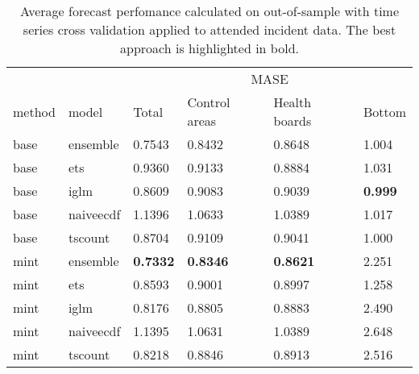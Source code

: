 \documentclass[
  authoryear,
  preprint,
  3p]{elsarticle}
\begin{document}
\begin{table}

\caption{\label{tbl-result}Average forecast perfomance calculated on
out-of-sample with time series cross validation applied to attended
incident data. The best approach is highlighted in
bold.}\begin{minipage}[t]{\linewidth}

{\centering 

\tabularnewline

\centering
\begin{tabular}[t]{llllll}
\toprule
\multicolumn{2}{c}{ } & \multicolumn{4}{c}{MASE} \\
\cmidrule(l{3pt}r{3pt}){3-6}
method & model & Total & Control areas & Health boards & Bottom\\
\midrule
base & ensemble & 0.7543 & 0.8432 & 0.8648 & 1.004\\
base & ets & 0.9360 & 0.9133 & 0.8884 & 1.031\\
base & iglm & 0.8609 & 0.9083 & 0.9039 & \textbf{0.999}\\
base & naiveecdf & 1.1396 & 1.0633 & 1.0389 & 1.017\\
base & tscount & 0.8704 & 0.9109 & 0.9041 & 1.000\\
\addlinespace
mint & ensemble & \textbf{0.7332} & \textbf{0.8346} & \textbf{0.8621} & 2.251\\
mint & ets & 0.8593 & 0.9001 & 0.8997 & 1.258\\
mint & iglm & 0.8176 & 0.8805 & 0.8883 & 2.490\\
mint & naiveecdf & 1.1395 & 1.0631 & 1.0389 & 2.648\\
mint & tscount & 0.8218 & 0.8846 & 0.8913 & 2.516\\
\bottomrule
\end{tabular}

}

\end{minipage}%
\newline
\begin{minipage}[t]{\linewidth}

{\centering 

\tabularnewline

}
\end{minipage}
\end{table}
\end{document}
